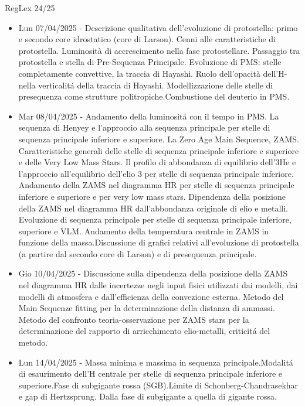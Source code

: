 \begin{frame}{RegLex 24/25}
\begin{itemize}
\item Lun 07/04/2025 - Descrizione qualitativa dell'evoluzione di protostella: primo e secondo core idrostatico (core di Larson). Cenni alle caratteristiche di protostella. Luminosità di accrescimento nella fase protostellare. Passaggio tra protostella e stella di Pre-Sequenza Principale. Evoluzione di PMS: stelle completamente convettive, la traccia di Hayashi. Ruolo dell'opacità dell'H- nella verticalit\'a della traccia di Hayashi. Modellizzazione delle stelle di presequenza come strutture politropiche.Combustione del deuterio in PMS.
\item Mar 08/04/2025 - Andamento della luminosit\'a con il tempo in PMS. La sequenza di Henyey e l'approccio alla sequenza principale per stelle di sequenza principale inferiore e superiore. La Zero Age Main Sequence, ZAMS. Caratteristiche generali delle stelle di sequenza principale inferiore e superiore e delle Very Low Mass Stars. Il profilo di abbondanza di equilibrio dell'3He e l'approccio all'equilibrio dell'elio 3 per stelle di sequenza principale inferiore. Andamento della ZAMS nel diagramma HR per stelle di sequenza principale inferiore e superiore e per very low mass stars. Dipendenza della posizione della ZAMS nel diagramma HR dall'abbondanza originale di elio e metalli. Evoluzione di sequenza principale per stelle di sequenza principale inferiore, superiore e VLM. Andamento della temperatura centrale in ZAMS in funzione della massa.Discussione di grafici relativi all'evoluzione di protostella (a partire dal secondo core di Larson) e di presequenza principale.
\item Gio 10/04/2025 - Discussione sulla dipendenza della posizione della ZAMS nel diagramma HR dalle incertezze negli input fisici utilizzati dai modelli, dai modelli di atmosfera e dall'efficienza della convezione esterna. Metodo del Main Sequenze fitting per la determinazione della distanza di ammassi. Metodo del confronto teoria-osservazione per ZAMS stars per la determinazione del rapporto di arricchimento elio-metalli, criticit\'a del metodo.
\item Lun 14/04/2025 - Massa minima e massima in sequenza principale.Modalit\'a di esaurimento dell'H centrale per stelle di sequenza principale inferiore e superiore.Fase di subgigante rossa (SGB).Limite di Schonberg-Chandrasekhar e gap di Hertzsprung. Dalla fase di subgigante a quella di gigante rossa.

\end{itemize}
\end{frame}

